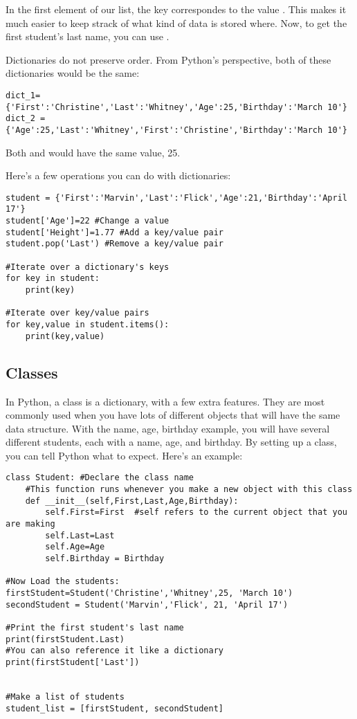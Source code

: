 In the first element of our list, the key  correspondes to the value . This makes it much easier to keep strack of what kind of data is stored where.  Now, to get the first student's last name, you can use .

Dictionaries do not preserve order.  From Python's perspective, both of these dictionaries would be the same:
\begin{Verbatim}
dict_1={'First':'Christine','Last':'Whitney','Age':25,'Birthday':'March 10'}
dict_2 = {'Age':25,'Last':'Whitney','First':'Christine','Birthday':'March 10'}

\end{Verbatim}
Both  and  would have the same value, 25.

Here's a few operations you can do with dictionaries:
\begin{Verbatim}
student = {'First':'Marvin','Last':'Flick','Age':21,'Birthday':'April 17'}
student['Age']=22 #Change a value
student['Height']=1.77 #Add a key/value pair
student.pop('Last') #Remove a key/value pair

#Iterate over a dictionary's keys
for key in student:
    print(key)

#Iterate over key/value pairs
for key,value in student.items():
    print(key,value)

\end{Verbatim}


\subsection*{Classes}
In Python, a class is a dictionary, with a few extra features. They are most commonly used when you have lots of different objects that will have the same data structure.  With the name, age, birthday example, you will have several different students, each with a name, age, and birthday.  By setting up a class, you can tell Python what to expect. Here's an example:
\begin{Verbatim}
class Student: #Declare the class name
    #This function runs whenever you make a new object with this class
    def __init__(self,First,Last,Age,Birthday):
        self.First=First  #self refers to the current object that you are making
        self.Last=Last
        self.Age=Age
        self.Birthday = Birthday

#Now Load the students:
firstStudent=Student('Christine','Whitney',25, 'March 10')
secondStudent = Student('Marvin','Flick', 21, 'April 17')

#Print the first student's last name
print(firstStudent.Last)
#You can also reference it like a dictionary
print(firstStudent['Last'])


#Make a list of students
student_list = [firstStudent, secondStudent]

\end{Verbatim}

